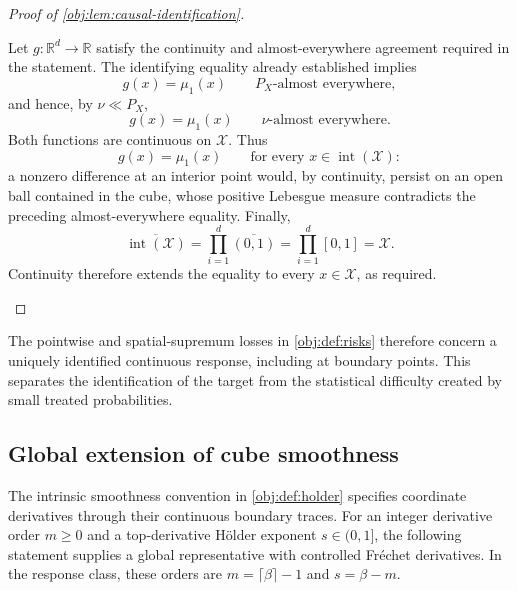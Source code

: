 \documentclass[11pt]{article}
\begin{document}
\begin{proof}[Proof of \cref{obj:lem:causal-identification}]
\begin{enumerate}
Let \(g:\mathbb R^d\to\mathbb R\) satisfy the continuity and almost-everywhere agreement required in the statement. The identifying equality already established implies
\[
g(x)=\mu_1(x)
\qquad P_X\text{-almost everywhere},
\]
and hence, by \(\nu\ll P_X\),
\[
g(x)=\mu_1(x)
\qquad \nu\text{-almost everywhere}.
\]
Both functions are continuous on \(\mathcal X\). Thus
\[
g(x)=\mu_1(x)
\qquad\text{for every }x\in\operatorname{int}(\mathcal X):
\]
a nonzero difference at an interior point would, by continuity, persist on an open ball contained in the cube, whose positive Lebesgue measure contradicts the preceding almost-everywhere equality. Finally,
\[
\overline{\operatorname{int}(\mathcal X)}
=\prod_{i=1}^{d}\overline{(0,1)}
=\prod_{i=1}^{d}[0,1]
=\mathcal X.
\]
Continuity therefore extends the equality to every \(x\in\mathcal X\), as required.
\end{enumerate}
\end{proof}

The pointwise and spatial-supremum losses in \cref{obj:def:risks} therefore concern a uniquely identified continuous response, including at boundary points. This separates the identification of the target from the statistical difficulty created by small treated probabilities.

\subsection{Global extension of cube smoothness}

The intrinsic smoothness convention in \cref{obj:def:holder} specifies coordinate derivatives through their continuous boundary traces. For an integer derivative order \(m\ge0\) and a top-derivative Hölder exponent \(s\in(0,1]\), the following statement supplies a global representative with controlled Fréchet derivatives. In the response class, these orders are \(m=\lceil\beta\rceil-1\) and \(s=\beta-m\).
\end{document}
